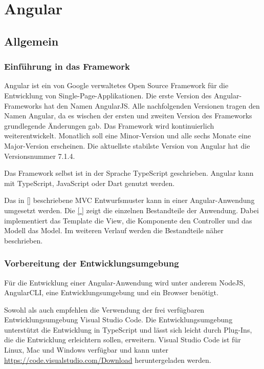 
\chapter{Angular}

\section{Allgemein}

\subsection{Einführung in das Framework}
Angular ist ein von Google verwaltetes Open Source Framework für die Entwicklung von Single-Page-Applikationen. Die erste Version des Angular-Frameworks hat den Namen AngularJS. Alle nachfolgenden Versionen tragen den Namen Angular, da es wischen der ersten und zweiten Version des Frameworks grundlegende Änderungen gab. Das Framework wird kontinuierlich weiterentwickelt. Monatlich soll eine Minor-Version und alle sechs Monate eine Major-Version erscheinen. Die aktuellste stabilste Version von Angular hat die Versionsnummer 7.1.4. \autocites[vgl.][vii\psqq]{Woiwode.2018}[vgl.][3\psqq]{Freeman.2018}

Das Framework selbst ist in der Sprache TypeScript geschrieben. Angular kann mit TypeScript, JavaScript oder Dart genutzt werden. \autocites[vgl.][vii\psq]{Woiwode.2018}[vgl.][13]{Steyer.2017}

Das in \autoref{} beschriebene MVC Entwurfsmuster kann in einer Angular-Anwendung umgesetzt werden. Die \autoref{ } zeigt die einzelnen Bestandteile der Anwendung. Dabei implementiert das Template die View, die Komponente den Controller und das Modell das Model. \autocite[vgl.][34\psqq]{Freeman.2018} Im weiteren Verlauf werden die Bestandteile näher beschrieben. 



\subsection{Vorbereitung der Entwicklungsumgebung}
Für die Entwicklung einer Angular-Anwendung wird unter anderem NodeJS, AngularCLI, eine Entwicklungsumgebung und ein Browser benötigt.  

Sowohl \textcite[vgl.][3\psqq]{Woiwode.2018} als auch \textcite[vgl.][3\psqq]{Steyer.2017} empfehlen die Verwendung der frei verfügbaren Entwicklungsumgebung Visual Studio Code. Die Entwicklungsumgebung unterstützt die Entwicklung in TypeScript und lässt sich leicht durch Plug-Ins, die die Entwicklung erleichtern sollen, erweitern. Visual Studio Code ist für Linux, Mac und Windows verfügbar und kann unter \url{https://code.visualstudio.com/Download}  heruntergeladen werden.

